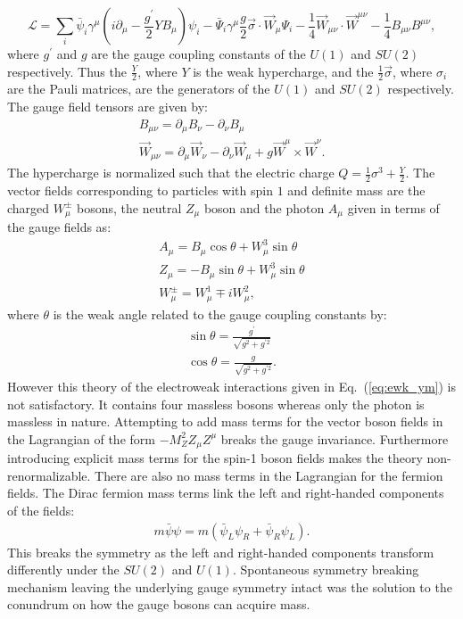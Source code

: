 \begin{equation} \label{eq:ewk_ym}
\mathcal{L} = \sum_{i} \bar{\psi}_{i} \gamma^{\mu}(i \partial_{\mu}-\frac{g^{'}}{2}YB_{\mu}) \psi_{i}  - \bar{\Psi}_{i}\gamma^{\mu}\frac{g}{2}\vec{\sigma}\cdot\vec{W}_{\mu}\Psi_{i} - \frac{1}{4}\vec{W}_{\mu\nu}\cdot\vec{W}^{\mu\nu} - \frac{1}{4} B_{\mu\nu} B^{\mu\nu},
\end{equation}
where $g^{'}$ and $g$ are the gauge coupling constants of the $U(1)$ and $SU(2)$ respectively. Thus the $\frac{Y}{2}$, where $Y$ is the weak hypercharge, and the $\frac{1}{2}\vec{\sigma}$, where $\sigma_{i}$ are the Pauli matrices, are the generators of the $U(1)$ and $SU(2)$ respectively. The gauge field tensors are given by:
\begin{eqnarray} \label{eq:ewk_field}
B_{\mu\nu} = \partial_{\mu}B_{\nu}-\partial_{\nu}B_{\mu}  \\
\vec{W}_{\mu\nu} =  \partial_{\mu}\vec{W}_{\nu}-\partial_{\nu}\vec{W}_{\mu} + g \vec{W}^{\mu} \times \vec{W}^{\nu}.
\end{eqnarray}
The hypercharge is normalized such that the electric charge $Q=\frac{1}{2}\sigma^3+\frac{Y}{2}$. The vector fields corresponding to particles with spin $1$ and definite mass are the charged $W^{\pm}_{\mu}$ bosons, the neutral $Z_{\mu}$ boson and the photon $A_{\mu}$ given in terms of the gauge fields as: 
\begin{eqnarray} \label{eq:bosons}
A_{\mu} = B_{\mu} \cos \theta + W_{\mu}^{3} \sin \theta \\
Z_{\mu} = -B_{\mu} \sin \theta + W_{\mu}^{3} \sin \theta \\
W_{\mu}^{\pm} = W^{1}_{\mu} \mp i W_{\mu}^{2},
\end{eqnarray}
where $\theta$ is the weak angle related to the gauge coupling constants by:
\begin{eqnarray} \label{eq:bosons}
\sin \theta = \frac{g^{'}}{\sqrt{g^2+g^{'2}}} \\
\cos \theta = \frac{g}{\sqrt{g^2+g^{'2}}}.
\end{eqnarray}
However this theory of the electroweak interactions given in Eq.~(\ref{eq:ewk_ym}) is not satisfactory. It contains four massless bosons whereas only the photon is massless in nature. Attempting to add mass terms for the vector boson fields in the Lagrangian of the form $-M_{Z}^2Z_{\mu}Z^{\mu}$ breaks the gauge invariance. Furthermore introducing explicit mass terms for the spin-1 boson fields makes the theory non-renormalizable. There are also no mass terms in the Lagrangian for the fermion fields.  The Dirac fermion mass terms link the left and right-handed components of the fields:
\begin{eqnarray} \label{eq:fermion}
m\bar{\psi}\psi = m(\bar{\psi}_L\psi_R+\bar{\psi}_R\psi_L).
\end{eqnarray}
This breaks the symmetry as the left and right-handed components transform differently under the $SU(2)$ and $U(1)$. Spontaneous symmetry breaking mechanism leaving the underlying gauge symmetry intact was the solution to the conundrum on how the gauge bosons can acquire mass. 

